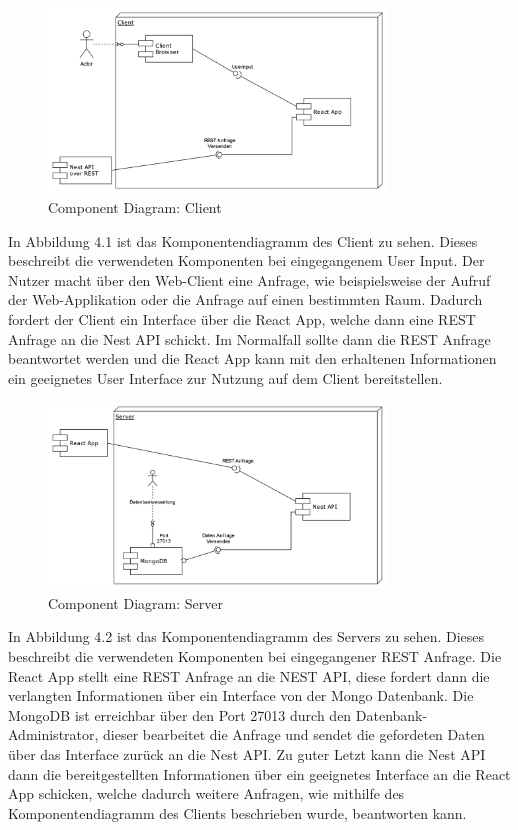 \begin{figure}[!h]
    \centering
    \includegraphics[width=0.8\textwidth]{./UML_Diagrams/ComponentDiagramClient.png}
    \caption{Component Diagram: Client}
    \label{fig:ComponentDiagramClient}
\end{figure}
In Abbildung 4.1 ist das Komponentendiagramm des Client zu sehen.
Dieses beschreibt die verwendeten Komponenten bei eingegangenem User Input.
Der Nutzer macht über den Web-Client eine Anfrage, wie beispielsweise der Aufruf der Web-Applikation oder die Anfrage auf einen bestimmten Raum.
Dadurch fordert der Client ein Interface über die React App, welche dann eine REST Anfrage an die Nest API schickt.
Im Normalfall sollte dann die REST Anfrage beantwortet werden und die React App kann mit den erhaltenen Informationen ein geeignetes User Interface zur Nutzung auf dem Client bereitstellen.

\begin{figure}[!h]
    \centering
    \includegraphics[width=0.8\textwidth]{./UML_Diagrams/ComponentDiagramServer.png}
    \caption{Component Diagram: Server}
    \label{fig:ComponentDiagramServer}
\end{figure}
In Abbildung 4.2 ist das Komponentendiagramm des Servers zu sehen.
Dieses beschreibt die verwendeten Komponenten bei eingegangener REST Anfrage.
Die React App stellt eine REST Anfrage an die NEST API, diese fordert dann die verlangten Informationen über ein Interface von der Mongo Datenbank.
Die MongoDB ist erreichbar über den Port 27013 durch den Datenbank-Administrator, dieser bearbeitet die Anfrage und sendet die gefordeten Daten über das Interface zurück an die Nest API.
Zu guter Letzt kann die Nest API dann die bereitgestellten Informationen über ein geeignetes Interface an die React App schicken, welche dadurch weitere Anfragen, wie mithilfe des Komponentendiagramm des Clients beschrieben wurde, beantworten kann.



